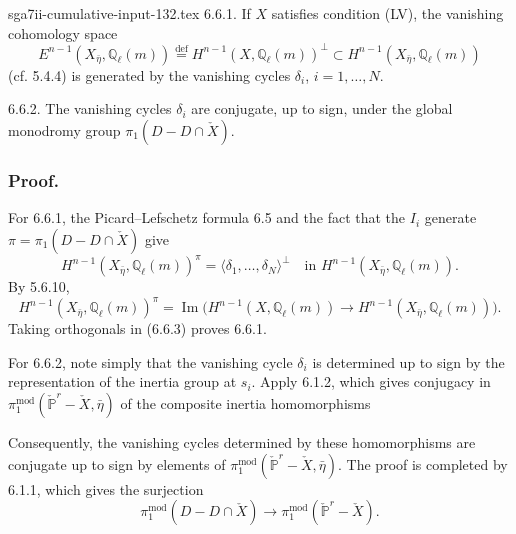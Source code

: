 \begin{filecontents*}{sga7ii-cumulative-input-132.tex}
\medskip
\noindent
\textup{6.6.1.} If $X$ satisfies condition (LV), the vanishing
cohomology space
\[
E^{n-1}(X_{\bar\eta},\mathbb Q_\ell(m))
\stackrel{\mathrm{def}}{=}
H^{n-1}(X,\mathbb Q_\ell(m))^\perp
\subset H^{n-1}(X_{\bar\eta},\mathbb Q_\ell(m))
\]
(cf. 5.4.4) is generated by the vanishing cycles
$\delta_i$, $i=1,\ldots,N$.

\medskip
\noindent
\textup{6.6.2.} The vanishing cycles $\delta_i$ are conjugate, up to
sign, under the global monodromy group
$\pi_1(D-D\cap\check X)$.

\subsubsection*{Proof.}
For 6.6.1, the Picard--Lefschetz formula 6.5 and the fact that the
$I_i$ generate $\pi=\pi_1(D-D\cap\check X)$ give
\begin{equation}\tag{6.6.3}
H^{n-1}(X_{\bar\eta},\mathbb Q_\ell(m))^\pi
=\bigl\langle\delta_1,\ldots,\delta_N\bigr\rangle^\perp
\quad\text{in }H^{n-1}(X_{\bar\eta},\mathbb Q_\ell(m)).
\end{equation}
By 5.6.10,
\begin{equation}\tag{6.6.4}
H^{n-1}(X_{\bar\eta},\mathbb Q_\ell(m))^\pi
=\operatorname{Im}\bigl(
H^{n-1}(X,\mathbb Q_\ell(m))
\longrightarrow H^{n-1}(X_{\bar\eta},\mathbb Q_\ell(m))
\bigr).
\end{equation}
Taking orthogonals in (6.6.3) proves 6.6.1.

For 6.6.2, note simply that the vanishing cycle $\delta_i$ is
determined up to sign by the representation of the inertia group at
$s_i$.  Apply 6.1.2, which gives conjugacy in
$\pi_1^{\mathrm{mod}}(\check{\mathbb P}^{r}-\check X,\bar\eta)$ of the
composite inertia homomorphisms
\begin{center}
\end{center}
Consequently, the vanishing cycles determined by these homomorphisms
are conjugate up to sign by elements of
$\pi_1^{\mathrm{mod}}(\check{\mathbb P}^{r}-\check X,\bar\eta)$.
The proof is completed by 6.1.1, which gives the surjection
\[
\pi_1^{\mathrm{mod}}(D-D\cap\check X)
\longrightarrow
\pi_1^{\mathrm{mod}}(\check{\mathbb P}^{r}-\check X).
\]

\end{filecontents*}
